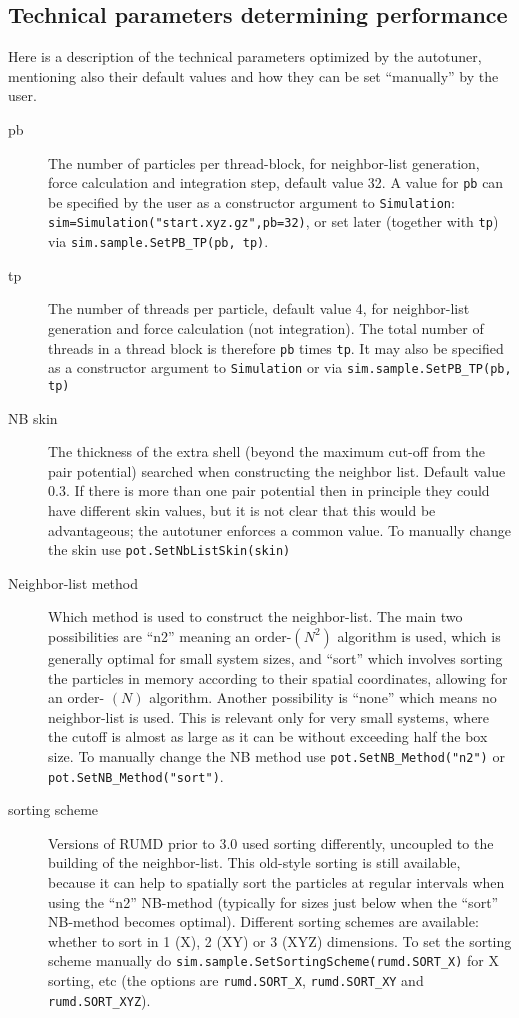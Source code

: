 \documentclass[a4paper]{article}
\begin{document}
\subsection{Technical parameters determining performance}

Here is a description of the technical parameters optimized by the autotuner,
mentioning also their default values and 
how they can be set ``manually'' by the user.

\begin{description}
\item[pb] The number of particles per thread-block, for neighbor-list 
generation, force calculation and integration step, default value 32. A value
for \verb|pb| can be specified by the user as a constructor argument to
\verb|Simulation|: \verb|sim=Simulation("start.xyz.gz",pb=32)|, or set
later (together with \verb|tp|) via \verb|sim.sample.SetPB_TP(pb, tp)|. 
\item[tp] The number of threads per particle, default value 4, for 
neighbor-list generation and force calculation (not integration). 
The total number of threads in a thread block is therefore 
\verb|pb| times \verb|tp|. It may also be specified as a constructor argument
to \verb|Simulation| or via \verb|sim.sample.SetPB_TP(pb, tp)|
\item[NB skin] The thickness of the extra shell (beyond the maximum cut-off
from the pair potential) searched when constructing the neighbor list. Default
value 0.3. If there is more than one pair potential then in 
principle they could have different skin values, but it is not clear that this
would be advantageous; the autotuner enforces a common value. To manually 
change the skin use \verb|pot.SetNbListSkin(skin)|
\item[Neighbor-list method] Which method is used to construct the neighbor-list. The main two possibilities are ``n2'' meaning an order-$(N^2)$ algorithm is used, which is generally optimal for small system sizes, and ``sort'' which involves sorting the particles in memory according to their spatial coordinates, allowing for an order- $(N)$ algorithm. Another possibility is ``none'' which means no neighbor-list is used. This is relevant only for very small systems, where the cutoff is almost as large as it can be without exceeding half the box size. To manually change the NB method use \verb|pot.SetNB_Method("n2")| or \verb|pot.SetNB_Method("sort")|.
\item[sorting scheme] Versions of RUMD prior to 3.0 used sorting differently, uncoupled to the building of the neighbor-list. This old-style sorting is still available, because it can help to spatially sort the particles at regular intervals when using the ``n2'' NB-method (typically for sizes just below when the ``sort'' NB-method becomes optimal). Different sorting schemes are available: whether to sort in 1 (X), 2 (XY) or 3 (XYZ) dimensions. To set the sorting scheme manually do \verb|sim.sample.SetSortingScheme(rumd.SORT_X)| for X sorting, etc (the options are \verb|rumd.SORT_X|, \verb|rumd.SORT_XY| and \verb|rumd.SORT_XYZ|).

\end{description}
\end{document}
